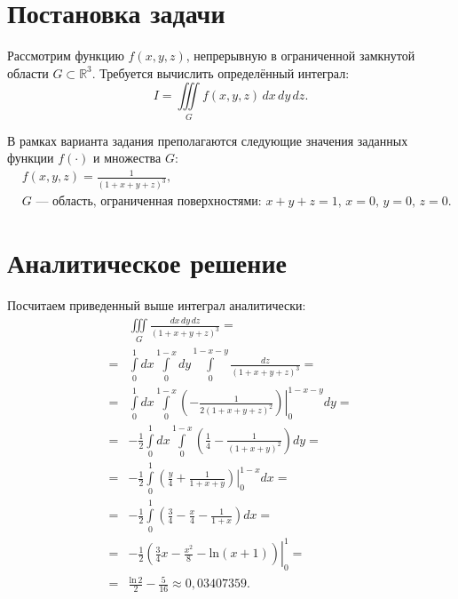 

\usepackage[utf8]{inputenc}                %
\usepackage[main=russian, english]{babel}  %
\usepackage[pdftex]{graphicx}              %
\usepackage{indentfirst}                   %

\usepackage{amsfonts}
\usepackage{amsmath}
\usepackage{multirow}


    
    \tableofcontents
    \clearpage
    \section{Постановка задачи}
        Рассмотрим функцию $f(x,y,z)$, непрерывную в ограниченной замкнутой области $G\subset\mathbb{R}^3$.
        Требуется вычислить определённый интеграл:
        \begin{equation}
            I = \iiint\limits_{G} f(x,y,z)\,dx\,dy\,dz.
        \end{equation}

        В рамках варианта задания преполагаются следующие значения заданных функции $f(\cdot)$ и множества $G$:
        \begin{equation}
            \begin{aligned}
                &f(x,y,z) = \frac{1}{(1+x+y+z)^3}, \\
                &\mbox{$G$~--- область, ограниченная поверхностями: $x+y+z=1$, $x=0$, $y=0$, $z=0$.}
            \end{aligned}
        \end{equation}

    \section{Аналитическое решение}
    Посчитаем приведенный выше интеграл аналитически:
    \begin{equation}
        \begin{aligned}
        &\iiint\limits_{G}\frac{dx\,dy\,dz}{(1+x+y+z)^3}
        =\\=
        &\int\limits_{0}^{1}dx\int\limits_{0}^{1-x}dy\int\limits_{0}^{1-x-y}\frac{dz}{(1+x+y+z)^3}
        =\\=
        &\int\limits_{0}^{1}dx\int\limits_{0}^{1-x}\left.\left( -\frac{1}{2(1+x+y+z)^2} \right)\right|_{0}^{1-x-y}dy
        =\\=
        &-\frac{1}{2}\int\limits_{0}^{1}dx\int\limits_{0}^{1-x}\left(\frac{1}{4}-\frac{1}{(1+x+y)^2}\right)dy
        =\\=
        &-\frac{1}{2}\int\limits_{0}^{1}\left.\left(\frac{y}{4} + \frac{1}{1+x+y}\right)\right|_{0}^{1-x}dx
        =\\=
        &-\frac{1}{2}\int\limits_{0}^{1}\left(\frac{3}{4} - \frac{x}{4} - \frac{1}{1+x}\right)dx
        =\\=
        &-\frac{1}{2}\left.\left(\frac{3}{4}x - \frac{x^2}{8} - \mathrm{ln}(x+1)\right)\right|_{0}^{1}
        =\\=
        &\frac{\mathrm{ln}\,2}{2} - \frac{5}{16} \approx 0,\!03407359.
        \end{aligned}
    \end{equation}


